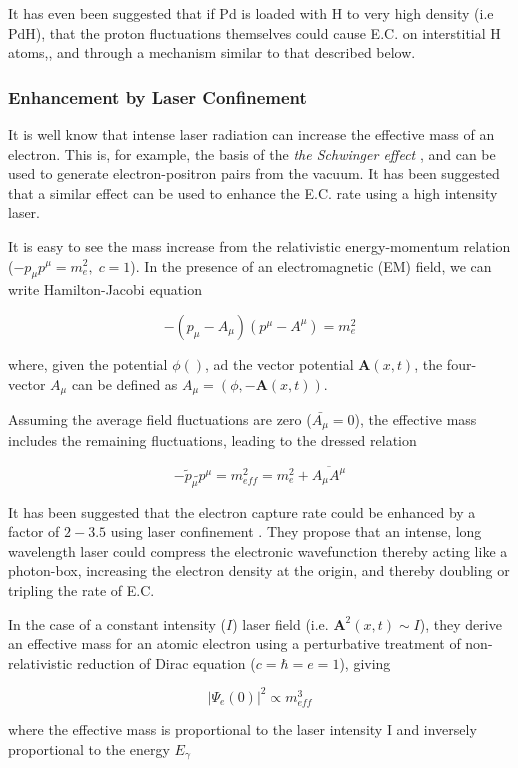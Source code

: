 \documentclass[%
 aip,
 jmp,%
 amsmath,amssymb,
 reprint,%
]{revtex4-1}
\begin{document}
It has even been suggested that if Pd is loaded with H to very high density (i.e PdH), that the proton fluctuations themselves could cause E.C. on
interstitial H atoms,\cite{widomlarsen2005},  and through a mechanism similar to that described below.

\subsubsection{Enhancement by Laser Confinement}
It is well know that intense laser radiation can increase the effective mass of an electron.  This is, for example, the basis of the 
\emph{the Schwinger effect }, and can be used to generate electron-positron pairs from the vacuum.\cite{PhysRev82664}
It has been suggested that a similar effect can be used to enhance the E.C. rate using a high intensity laser. \cite{sato}

It is easy to see the mass increase from the relativistic energy-momentum relation ($-p_{\mu}p^{\mu}=m_{e}^{2},\;c=1$).  
In the presence of an electromagnetic (EM) field, we can write Hamilton-Jacobi equation

$$-(p_{\mu}-A_{\mu})(p^{\mu}-A^{\mu})=m_{e}^{2}$$

where, given the potential $\phi()$, ad the vector potential $\mathbf{A}(x,t)$,  the four-vector $A_{\mu}$ can be defined as $A_{\mu}=(\phi, -\mathbf{A}(x,t))$.

Assuming the average field fluctuations are zero ($\bar{A_{\mu}}=0$), the effective mass includes the remaining fluctuations, leading to the dressed relation

$$-\tilde{p}_{\mu}\tilde{}p^{\mu}=m_{eff}^{2}=m_{e}^{2}+\overline{A_{\mu}A^{\mu}}$$


It has been suggested that the electron capture rate could be enhanced by a factor of $2-3.5$ using laser confinement \cite{sato}.
They propose that an intense, long wavelength laser could compress the electronic wavefunction thereby acting like a photon-box,
increasing the electron density at the origin, and thereby doubling or tripling the rate of E.C.  

In the case of a constant intensity ($I$) laser field  (i.e. $\mathbf{A}^{2}(x,t)\sim I$),  they derive an effective mass for an atomic electron using a 
perturbative treatment of non-relativistic reduction of Dirac equation ($c=\hbar=e=1$), giving

$$\big\vert\Psi_{e}(0)\big\vert^{2}\propto m_{eff}^{3}$$

where the effective mass is proportional to the laser intensity I and inversely proportional to the energy $E_{\gamma}$
\end{document}

